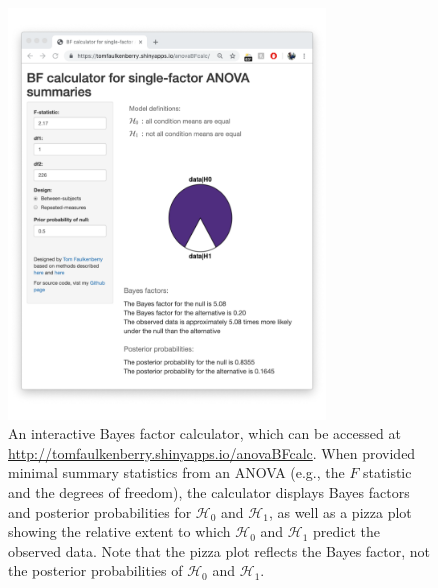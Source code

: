 \documentclass[doc]{apa6}
\begin{document}
\begin{figure}
\centering
\includegraphics[width=0.75\textwidth]{fig1.pdf}
\caption{An interactive Bayes factor calculator, which can be accessed at \url{http://tomfaulkenberry.shinyapps.io/anovaBFcalc}. When provided minimal summary statistics from an ANOVA (e.g., the \(F\) statistic and the degrees of freedom), the calculator displays Bayes factors and posterior probabilities for \(\mathcal{H}_0\) and \(\mathcal{H}_1\), as well as a pizza plot showing the relative extent to which \(\mathcal{H}_0\) and \(\mathcal{H}_1\) predict the observed data. Note that the pizza plot reflects the Bayes factor, not the posterior probabilities of \(\mathcal{H}_0\) and \(\mathcal{H}_1\).}
\end{figure}
\end{document}
